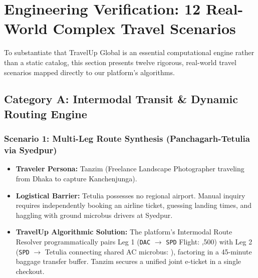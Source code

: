 \documentclass[11pt,a4paper]{article}
\begin{document}
\newpage

\section{Engineering Verification: 12 Real-World Complex Travel Scenarios}

To substantiate that TravelUp Global is an essential computational engine rather than a static catalog, this section presents twelve rigorous, real-world travel scenarios mapped directly to our platform's algorithms.

\subsection{Category A: Intermodal Transit \& Dynamic Routing Engine}

\subsubsection{Scenario 1: Multi-Leg Route Synthesis (Panchagarh-Tetulia via Syedpur)}
\begin{itemize}[leftmargin=*]
    \item \textbf{Traveler Persona:} Tanzim (Freelance Landscape Photographer traveling from Dhaka to capture Kanchenjunga).
    \item \textbf{Logistical Barrier:} Tetulia possesses no regional airport. Manual inquiry requires independently booking an airline ticket, guessing landing times, and haggling with ground microbus drivers at Syedpur.
    \item \textbf{TravelUp Algorithmic Solution:} The platform's Intermodal Route Resolver programmatically pairs Leg 1 (\texttt{DAC} $\rightarrow$ \texttt{SPD} Flight: ,500) with Leg 2 (\texttt{SPD} $\rightarrow$ Tetulia connecting shared AC microbus: ), factoring in a 45-minute baggage transfer buffer. Tanzim secures a unified joint e-ticket in a single checkout.
\end{itemize}
\end{document}
